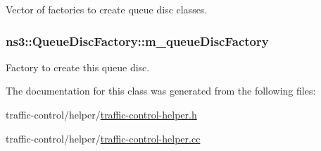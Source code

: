 Vector of factories to create queue disc classes. 

\subsubsection[{\texorpdfstring{m\+\_\+queue\+Disc\+Factory}{m_queueDiscFactory}}]{ ns3\+::\+Queue\+Disc\+Factory\+::m\+\_\+queue\+Disc\+Factory\hspace{0.3cm}{\ttfamily [private]}}\hypertarget{classns3_1_1QueueDiscFactory_acc62f610bfd64e570a89891a1941a197}{}\label{classns3_1_1QueueDiscFactory_acc62f610bfd64e570a89891a1941a197}


Factory to create this queue disc. 



The documentation for this class was generated from the following files\+:\begin{DoxyCompactItemize}
\item 
traffic-\/control/helper/\hyperlink{traffic-control-helper_8h}{traffic-\/control-\/helper.\+h}\item 
traffic-\/control/helper/\hyperlink{traffic-control-helper_8cc}{traffic-\/control-\/helper.\+cc}\end{DoxyCompactItemize}
